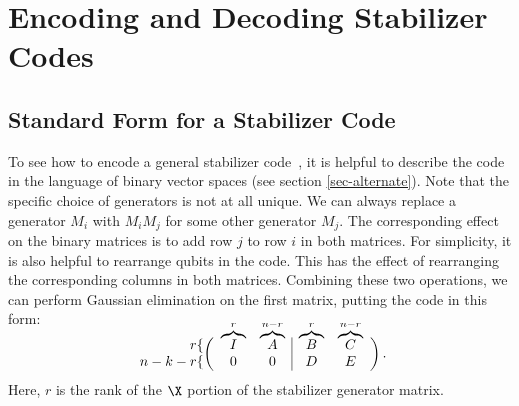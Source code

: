 \chapter{Encoding and Decoding Stabilizer Codes}
\label{chap-encoding}

\section{Standard Form for a Stabilizer Code}

To see how to encode a general stabilizer code~\cite{cleve}, it is helpful to
describe the code in the language of binary vector spaces (see section
\ref{sec-alternate}).  Note that the specific choice of generators is not
at all unique.  We can always replace a generator $M_i$ with $M_i M_j$ for
some other generator $M_j$.  The corresponding effect on the binary matrices
is to add row $j$ to row $i$ in both matrices.  For simplicity, it is also
helpful to rearrange qubits in the code.  This has the effect of rearranging
the corresponding columns in both matrices.  Combining these two operations,
we can perform Gaussian elimination on the first matrix, putting the code in
this form:
\vspace{2.5ex}
\begin{equation}
	\begin{array}{r} r\{ \\ n-k-r\{ \end{array} \!\!\!\!
	\left( \begin{array}{cc|cc}
		       \raisebox{0ex}[1.5ex]{$\overbrace{I}^r$} &
		       \raisebox{0ex}[1.5ex]{$\overbrace{A}^{n-r}$} &
		       \raisebox{0ex}[1.5ex]{$\overbrace{B}^r$} &
		       \raisebox{0ex}[1.5ex]{$\overbrace{C}^{n-r}$} \\
		       0 & 0 & D & E
	\end{array} \right).
\end{equation}
Here, $r$ is the rank of the $\X$ portion of the stabilizer generator matrix.

